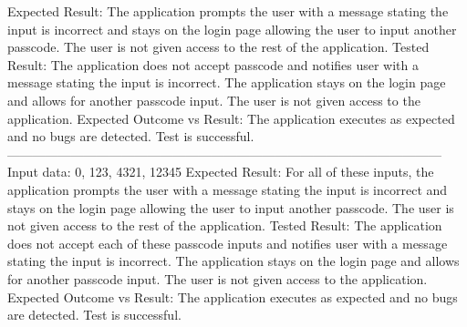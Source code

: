 \documentclass[letterpaper,12pt,titlepage]{article}
\begin{document}
Expected Result: The application prompts the user with a message stating the input is incorrect and stays on the login page allowing the user to input another passcode. The user is not given access to the rest of the application.
\newline
\newline
Tested Result: The application does not accept passcode and notifies user with a message stating the input is incorrect. The application stays on the login page and allows for another passcode input. The user is not given access to the application.
\newline
\newline
Expected Outcome vs Result: The application executes as expected and no bugs are detected. Test is successful.
\newline
\newline
------------------------------------------------------------------------------------------------------
\newline
Input data: 0, 123, 4321, 12345
\newline
\newline
Expected Result: For all of these inputs, the application prompts the user with a message stating the input is incorrect and stays on the login page allowing the user to input another passcode. The user is not given access to the rest of the application.
\newline
\newline
Tested Result: The application does not accept each of these passcode inputs and notifies user with a message stating the input is incorrect. The application stays on the login page and allows for another passcode input. The user is not given access to the application.
\newline
\newline
Expected Outcome vs Result: The application executes as expected and no bugs are detected. Test is successful.
\newline
\newline
\end{document}
